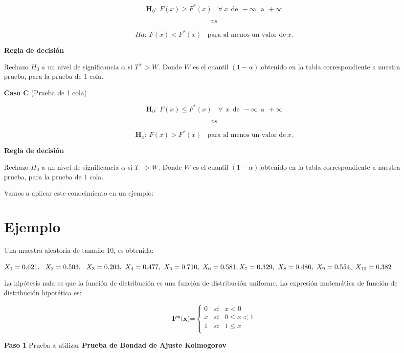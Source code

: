 \documentclass[
  a4paper,
  oneside,
  openany]{book}
\begin{document}
\[\textbf{H}_0: \ F(x) \geq F^*(x) \ \ \ \ \forall\ x\ \ \mbox{de} \ \ -\infty \  \ \  \mbox{a} \ \ +\infty\]

\[vs\]

\[Ha: \ F(x) < F^*(x) \ \ \ \ \mbox{para al menos un valor de} \  x.\]

\textbf{Regla de decisión}

Rechazo \(H_0\) a un nivel de significancia \(\alpha\) si \(T^+>W\). Donde \(W\) es el cuantil \((1-\alpha)\),obtenido en la tabla correspondiente a nuestra prueba, para la prueba de 1 cola.

\textbf{Caso C} (Prueba de 1 cola)

\[\textbf{H}_0:\ F(x) \leq F^*(x) \ \ \ \ \forall \ \ x \ \  \mbox{de} \  \ -\infty \ \  \mbox{a} \ \  +\infty\]

\[vs\]

\[\textbf{H}_a: \ F(x) > F^*(x) \ \ \ \ \mbox{para al menos un valor de} \  x.\]

\textbf{Regla de decisión}

Rechazo \(H_0\) a un nivel de significancia \(\alpha\) si \(T^->W\). Donde \(W\) es el cuantil \((1-\alpha)\),obtenido en la tabla correspondiente a nuestra prueba, para la prueba de 1 cola.

Vamos a aplicar este conocimiento en un ejemplo:

\hypertarget{ejemplo-11}{%
\section{Ejemplo}\label{ejemplo-11}}

Una muestra aleatoria de tamaño 10, es obtenida:

\(X_{1}=0.621,\ \ X_{2}=0.503, \ \ X_{3}=0.203, \ X_{4}=0.477, \ X_{5}=0.710, \ X_{6}=0.581, \\ X_{7}=0.329, \ X_{8}=0.480, \  X_{9}=0.554, \ X_{10}=0.382\)

La hipótesis nula es que la función de distribución es una función de distribución uniforme.
La expresión matemática de función de distribución hipotética es:

\[
\textbf{F*(x)=} \left\{
\begin{array}{lcc}
0 & si & x < 0 \\
x & si & 0 \leq x < 1 \\
1 & si & 1 \leq x \\
\end{array}
\right.
\]

\textbf{Paso 1} Prueba a utilizar \textbf{Prueba de Bondad de Ajuste Kolmogorov}
\end{document}
